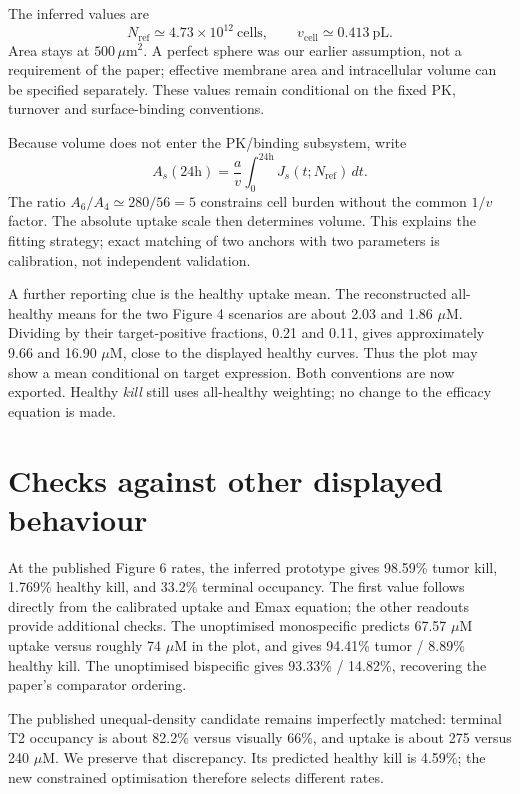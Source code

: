 \documentclass[11pt,a4paper]{article}
\begin{document}
The inferred values are
\[
 N_{\mathrm{ref}}\simeq4.73\times10^{12}\ \mathrm{cells},\qquad
 v_{\mathrm{cell}}\simeq0.413\ \mathrm{pL}.
\]
Area stays at $500\,\mu$m$^2$. A perfect sphere was our earlier assumption, not a requirement of the paper; effective membrane area and intracellular volume can be specified separately. These values remain conditional on the fixed PK, turnover and surface-binding conventions.

Because volume does not enter the PK/binding subsystem, write
\[
 A_s(24\mathrm{h})=\frac{a}{v}\int_0^{24\mathrm{h}}J_s(t;N_{\mathrm{ref}})\,dt.
\]
The ratio $A_6/A_4\simeq280/56=5$ constrains cell burden without the common $1/v$ factor. The absolute uptake scale then determines volume. This explains the fitting strategy; exact matching of two anchors with two parameters is calibration, not independent validation.

A further reporting clue is the healthy uptake mean. The reconstructed all-healthy means for the two Figure 4 scenarios are about 2.03 and 1.86 $\mu$M. Dividing by their target-positive fractions, 0.21 and 0.11, gives approximately 9.66 and 16.90 $\mu$M, close to the displayed healthy curves. Thus the plot may show a mean conditional on target expression. Both conventions are now exported. Healthy \emph{kill} still uses all-healthy weighting; no change to the efficacy equation is made.

\section{Checks against other displayed behaviour}
At the published Figure 6 rates, the inferred prototype gives 98.59\% tumor kill, 1.769\% healthy kill, and 33.2\% terminal occupancy. The first value follows directly from the calibrated uptake and Emax equation; the other readouts provide additional checks. The unoptimised monospecific predicts 67.57 $\mu$M uptake versus roughly 74 $\mu$M in the plot, and gives 94.41\% tumor / 8.89\% healthy kill. The unoptimised bispecific gives 93.33\% / 14.82\%, recovering the paper's comparator ordering.

The published unequal-density candidate remains imperfectly matched: terminal T2 occupancy is about 82.2\% versus visually 66\%, and uptake is about 275 versus 240 $\mu$M. We preserve that discrepancy. Its predicted healthy kill is 4.59\%; the new constrained optimisation therefore selects different rates.
\end{document}
